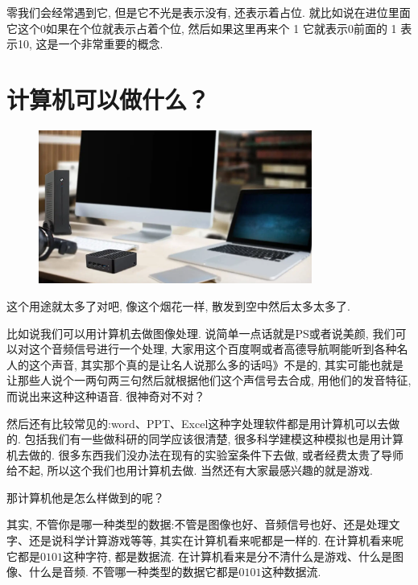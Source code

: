 \begin{figure}[ht]
\begin{minipage}[t]{0.4\textwidth}
    \caption{}
    \label{fig:img2_10}
  \end{minipage}
\end{figure}

零我们会经常遇到它, 但是它不光是表示没有, 还表示着占位. 就比如说在进位里面它这个0如果在个位就表示占着个位, 然后如果这里再来个 1 它就表示0前面的 1 表示10, 这是一个非常重要的概念. 

\section{计算机可以做什么？}

\begin{figure}[ht]
  \centering\includegraphics[width=0.8\textwidth]{asset/7b8b9bd7-b7db-4420-bcce-537d0be46a31.png}
  \caption{}
  \label{fig:img2_11}
\end{figure}

这个用途就太多了对吧, 像这个烟花一样, 散发到空中然后太多太多了. 

比如说我们可以用计算机去做图像处理. 说简单一点话就是PS或者说美颜, 我们可以对这个音频信号进行一个处理, 大家用这个百度啊或者高德导航啊能听到各种名人的这个声音, 其实那个真的是让名人说那么多的话吗》不是的, 其实可能也就是让那些人说个一两句两三句然后就根据他们这个声信号去合成, 用他们的发音特征, 而说出来这种这种语音. 很神奇对不对？

然后还有比较常见的:word、PPT、Excel这种字处理软件都是用计算机可以去做的. 包括我们有一些做科研的同学应该很清楚, 很多科学建模这种模拟也是用计算机去做的. 很多东西我们没办法在现有的实验室条件下去做, 或者经费太贵了导师给不起, 所以这个我们也用计算机去做. 当然还有大家最感兴趣的就是游戏. 

那计算机他是怎么样做到的呢？

其实, 不管你是哪一种类型的数据:不管是图像也好、音频信号也好、还是处理文字、还是说科学计算游戏等等, 其实在计算机看来呢都是一样的. 在计算机看来呢它都是$0101$这种字符, 都是数据流. 在计算机看来是分不清什么是游戏、什么是图像、什么是音频. 不管哪一种类型的数据它都是$0101$这种数据流. 

